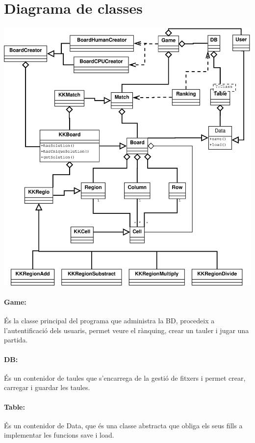 \documentclass[a4paper,12pt]{article}
\begin{document}
\section{Diagrama de classes}
\includegraphics[width=22cm]{./Diagrama1.eps}

\newpage
\paragraph{Game:}
És la classe principal del programa que administra la BD, procedeix a l’autentificació dels usuaris, permet veure el rànquing, crear un tauler i jugar una partida.

\paragraph{DB:}És un contenidor de taules que s’encarrega de la gestió de fitxers i permet crear, carregar i guardar les taules.

\paragraph{Table:}És un contenidor de Data, que és una classe abstracta que obliga els seus fills a implementar les funcions save i load.
\end{document}
